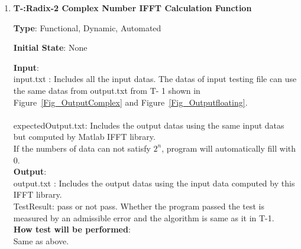 \documentclass[12pt, titlepage]{article}
\newcounter{tnum}
\begin{document}
\begin{enumerate}
\item{\textbf{T-\thetnum \label{R2CFFT}:Radix-2 Complex Number IFFT Calculation Function}}

\textbf {Type}: Functional, Dynamic, Automated
					
\textbf {Initial State}: None
					
\textbf {Input}:\\{\large input.txt} :  Includes all the input datas. The datas of  input testing file can use the same datas from output.txt from T- 1 shown in Figure~\ref{Fig_OutputComplex} and Figure~\ref{Fig_Outputfloating}. \\ \\
{\large expectedOutput.txt}:  Includes the output datas using the same input datas but computed by Matlab IFFT library.\\ 
If the numbers of data can not satisfy $2^n$, program will automatically fill with 0.\\
					
\textbf {Output}: \\{\large output.txt} : Includes the output datas using the input data computed by this IFFT library.\\
{\large TestResult}: pass or not pass. Whether the program passed the test is measured by an admissible error and the algorithm is same as it in T-1.\\
\textbf {How test will be performed}: \\
Same as above.
\end{enumerate}
\end{document}
